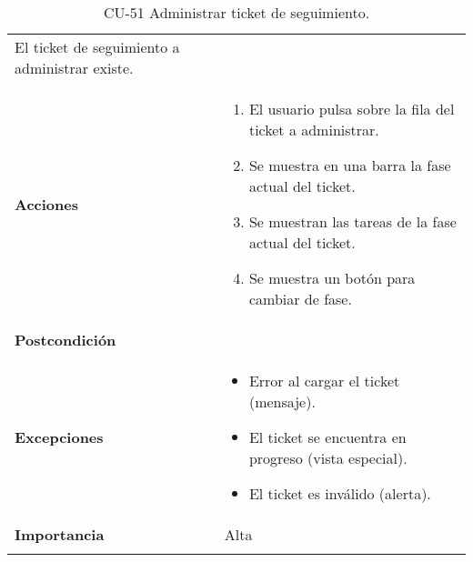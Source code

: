 \begin{longtable}[]{@{}ll@{}}
\begin{minipage}[t]{0.68\columnwidth}
El ticket de seguimiento a administrar existe.\strut
\end{minipage}\tabularnewline
\begin{minipage}[t]{0.26\columnwidth}\raggedright
\textbf{Acciones}\strut
\end{minipage} & \begin{minipage}[t]{0.68\columnwidth}\raggedright
\begin{enumerate}
\def\labelenumi{\arabic{enumi}.}
\tightlist
\item
  El usuario pulsa sobre la fila del ticket a administrar.
\item
  Se muestra en una barra la fase actual del ticket.
\item
  Se muestran las tareas de la fase actual del ticket.
\item
  Se muestra un botón para cambiar de fase.
\end{enumerate}\strut
\end{minipage}\tabularnewline
\begin{minipage}[t]{0.26\columnwidth}\raggedright
\textbf{Postcondición}\strut
\end{minipage} & \begin{minipage}[t]{0.68\columnwidth}\raggedright
\strut
\end{minipage}\tabularnewline
\begin{minipage}[t]{0.26\columnwidth}\raggedright
\textbf{Excepciones}\strut
\end{minipage} & \begin{minipage}[t]{0.68\columnwidth}\raggedright
\begin{itemize}
\tightlist
\item
  Error al cargar el ticket (mensaje).
\item
  El ticket se encuentra en progreso (vista especial).
\item
  El ticket es inválido (alerta).
\end{itemize}\strut
\end{minipage}\tabularnewline
\begin{minipage}[t]{0.26\columnwidth}\raggedright
\textbf{Importancia}\strut
\end{minipage} & \begin{minipage}[t]{0.68\columnwidth}\raggedright
Alta\strut
\end{minipage}\tabularnewline
\bottomrule
\caption{CU-51 Administrar ticket de seguimiento.}
\end{longtable}

